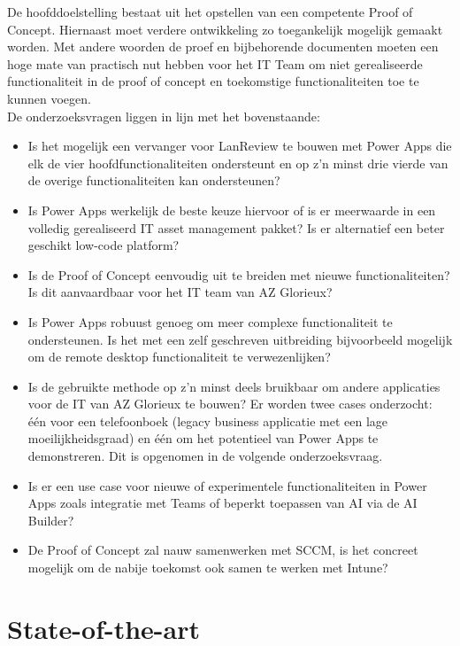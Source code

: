 \vspace{5mm}

De hoofddoelstelling bestaat uit het opstellen van een competente Proof of Concept. Hiernaast moet verdere ontwikkeling zo toegankelijk mogelijk gemaakt worden. Met andere woorden de proef en bijbehorende documenten moeten een hoge mate van practisch nut hebben voor het IT Team om niet gerealiseerde functionaliteit in de proof of concept en toekomstige functionaliteiten toe te kunnen voegen.\\
De onderzoeksvragen liggen in lijn met het bovenstaande:
\begin{itemize}
    \item Is het mogelijk een vervanger voor LanReview te bouwen met Power Apps die elk de vier hoofdfunctionaliteiten ondersteunt en op z'n minst drie vierde van de overige functionaliteiten kan ondersteunen?
    \item Is Power Apps werkelijk de beste keuze hiervoor of is er meerwaarde in een volledig gerealiseerd IT asset management pakket? Is er alternatief een beter geschikt low-code platform?
    \item Is de Proof of Concept eenvoudig uit te breiden met nieuwe functionaliteiten? Is dit aanvaardbaar voor het IT team van AZ Glorieux?
    \item Is Power Apps robuust genoeg om meer complexe functionaliteit te ondersteunen. Is het met een zelf geschreven uitbreiding bijvoorbeeld mogelijk om de remote desktop functionaliteit te verwezenlijken?
    \item Is de gebruikte methode op z'n minst deels bruikbaar om andere applicaties voor de IT van AZ Glorieux te bouwen? Er worden twee cases onderzocht: één voor een telefoonboek (legacy business applicatie met een lage moeilijkheidsgraad) en één om het potentieel van Power Apps te demonstreren. Dit is opgenomen in de volgende onderzoeksvraag.
    \item Is er een use case voor nieuwe of experimentele functionaliteiten in Power Apps zoals integratie met Teams of beperkt toepassen van AI via de AI Builder?
    \item De Proof of Concept zal nauw samenwerken met SCCM, is het concreet mogelijk om de nabije toekomst ook samen te werken met Intune?
\end{itemize}



\section{State-of-the-art}
\label{sec:state-of-the-art}

